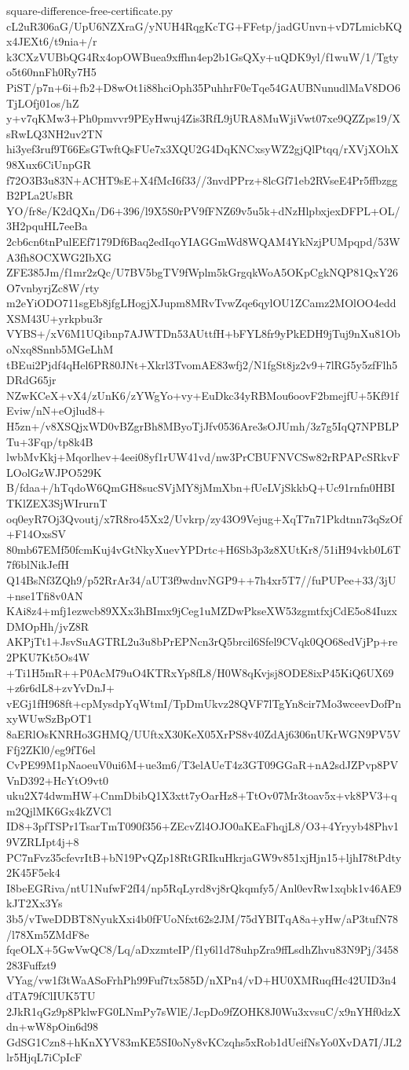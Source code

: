 \documentclass[11pt]{article}
\theoremstyle{definition}
\theoremstyle{remark}
\begin{document}
\begin{filecontents*}[overwrite]{square-difference-free-certificate.py}
cL2uR306aG/UpU6NZXraG/yNUH4RqgKcTG+FFetp/jadGUnvn+vD7LmicbKQx4JEXt6/t9nia+/r
k3CXzVUBbQG4Rx4opOWBuea9xffhn4ep2b1GsQXy+uQDK9yl/f1wuW/1/Tgtyo5t60nnFh0Ry7H5
PiST/p7n+6i+fb2+D8wOt1i88hciOph35PuhhrF0eTqe54GAUBNunudlMaV8DO6TjLOfj01os/hZ
y+v7qKMw3+Ph0pmvvr9PEyHwuj4Zis3RfL9jURA8MuWjiVwt07xe9QZZps19/XsRwLQ3NH2uv2TN
hi3yef3ruf9T66EsGTwftQsFUe7x3XQU2G4DqKNCxsyWZ2gjQlPtqq/rXVjXOhX98Xux6CiUnpGR
f72O3B3u83N+ACHT9sE+X4fMcI6f33//3nvdPPrz+8lcGf71eb2RVseE4Pr5ffbzggB2PLa2UsBR
YO/fr8e/K2dQXn/D6+396/l9X5S0rPV9fFNZ69v5u5k+dNzHlpbxjexDFPL+OL/3H2pquHL7eeBa
2cb6cn6tnPulEEf7179Df6Baq2edIqoYIAGGmWd8WQAM4YkNzjPUMpqpd/53WA3fh8OCXWG2IbXG
ZFE385Jm/f1mr2zQc/U7BV5bgTV9fWplm5kGrgqkWoA5OKpCgkNQP81QxY26O7vnbyrjZc8W/rty
m2eYiODO711sgEb8jfgLHogjXJupm8MRvTvwZqe6qylOU1ZCamz2MOlOO4eddXSM43U+yrkpbu3r
VYBS+/xV6M1UQibnp7AJWTDn53AUttfH+bFYL8fr9yPkEDH9jTuj9nXu81OboNxq8Snnb5MGeLhM
tBEui2Pjdf4qHel6PR80JNt+Xkrl3TvomAE83wfj2/N1fgSt8jz2v9+7lRG5y5zfFlh5DRdG65jr
NZwKCeX+vX4/zUnK6/zYWgYo+vy+EuDkc34yRBMou6oovF2bmejfU+5Kf91fEviw/nN+eOjlud8+
H5zn+/v8XSQjxWD0vBZgrBh8MByoTjJfv0536Are3sOJUmh/3z7g5IqQ7NPBLPTu+3Fqp/tp8k4B
lwbMvKkj+Mqorlhev+4eei08yf1rUW41vd/nw3PrCBUFNVCSw82rRPAPcSRkvFLOolGzWJPO529K
B/fdaa+/hTqdoW6QmGH8sucSVjMY8jMmXbn+fUeLVjSkkbQ+Uc91rnfn0HBITKlZEX3SjWIrurnT
oq0eyR7Oj3Qvoutj/x7R8ro45Xx2/Uvkrp/zy43O9Vejug+XqT7n71Pkdtnn73qSzOf+F14OxsSV
80mb67EMf50fcmKuj4vGtNkyXuevYPDrtc+H6Sb3p3z8XUtKr8/51iH94vkb0L6T7f6blNikJefH
Q14BsNf3ZQh9/p52RrAr34/aUT3f9wdnvNGP9++7h4xr5T7//fuPUPee+33/3jU+nse1Tfi8v0AN
KAi8z4+mfj1ezwcb89XXx3hBImx9jCeg1uMZDwPkseXW53zgmtfxjCdE5o84IuzxDMOpHh/jvZ8R
AKPjTt1+JsvSuAGTRL2u3u8bPrEPNcn3rQ5brcil6Sfel9CVqk0QO68edVjPp+re2PKU7Kt5Os4W
+Ti1H5mR++P0AcM79uO4KTRxYp8fL8/H0W8qKvjsj8ODE8ixP45KiQ6UX69+z6r6dL8+zvYvDnJ+
vEGj1fH968ft+cpMysdpYqWtmI/TpDmUkvz28QVF7lTgYn8cir7Mo3wceevDofPnxyWUwSzBpOT1
8aERlOsKNRHo3GHMQ/UUftxX30KeX05XrPS8v40ZdAj6306nUKrWGN9PV5VFfj2ZKl0/eg9fT6el
CvPE99M1pNaoeuV0ui6M+ue3m6/T3elAUeT4z3GT09GGaR+nA2sdJZPvp8PVVnD392+HcYtO9vt0
uku2X74dwmHW+CnmDbibQ1X3xtt7yOarHz8+TtOv07Mr3toav5x+vk8PV3+qm2QjlMK6Gx4kZVCl
ID8+3pfTSPr1TsarTmT090f356+ZEcvZl4OJO0aKEaFhqjL8/O3+4Yryyb48Phv19VZRLIpt4j+8
PC7nFvz35cfevrItB+bN19PvQZp18RtGRIkuHkrjaGW9v851xjHjn15+ljhI78tPdty2K45F5ek4
I8beEGRiva/ntU1NufwF2fI4/np5RqLyrd8vj8rQkqmfy5/Anl0evRw1xqbk1v46AE9kJT2Xx3Ys
3b5/vTweDDBT8NyukXxi4b0fFUoNfxt62s2JM/75dYBITqA8a+yHw/aP3tufN78/l78Xm5ZMdF8e
fqeOLX+5GwVwQC8/Lq/aDxzmteIP/f1y6l1d78uhpZra9ffLsdhZhvu83N9Pj/3458283Fuffzt9
VYag/vw1f3tWaASoFrhPh99Fuf7tx585D/nXPn4/vD+HU0XMRuqfHc42UID3n4dTA79fClIUK5TU
2JkR1qGz9p8PklwFG0LNmPy7sWlE/JcpDo9fZOHK8J0Wu3xvsuC/x9nYHf0dzXdn+wW8pOin6d98
GdSG1Czn8+hKnXYV83mKE5SI0oNy8vKCzqhs5xRob1dUeifNsYo0XvDA7I/JL2lr5HjqL7iCpIcF

\end{filecontents*}
\end{document}
